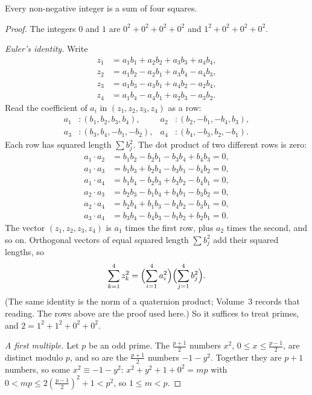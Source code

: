 \begin{theorem}[Lagrange, 1770]\label{thm:foursq}
Every non-negative integer is a sum of four squares.
\end{theorem}
\begin{proof}
The integers $0$ and $1$ are $0^2+0^2+0^2+0^2$ and $1^2+0^2+0^2+0^2$.

\emph{Euler's identity.} Write
\begin{align*}
z_1&=a_1b_1+a_2b_2+a_3b_3+a_4b_4,\\
z_2&=a_1b_2-a_2b_1+a_3b_4-a_4b_3,\\
z_3&=a_1b_3-a_3b_1+a_4b_2-a_2b_4,\\
z_4&=a_1b_4-a_4b_1+a_2b_3-a_3b_2.
\end{align*}
Read the coefficient of $a_i$ in $(z_1,z_2,z_3,z_4)$ as a row:
\[
\begin{aligned}
a_1&\colon (b_1,b_2,b_3,b_4),&
a_2&\colon (b_2,-b_1,-b_4,b_3),\\
a_3&\colon (b_3,b_4,-b_1,-b_2),&
a_4&\colon (b_4,-b_3,b_2,-b_1).
\end{aligned}
\]
Each row has squared length $\sum b_j^2$. The dot product of two different rows is zero:
\begin{align*}
a_1\cdot a_2&=b_1b_2-b_2b_1-b_3b_4+b_4b_3=0,\\
a_1\cdot a_3&=b_1b_3+b_2b_4-b_3b_1-b_4b_2=0,\\
a_1\cdot a_4&=b_1b_4-b_2b_3+b_3b_2-b_4b_1=0,\\
a_2\cdot a_3&=b_2b_3-b_1b_4+b_4b_1-b_3b_2=0,\\
a_2\cdot a_4&=b_2b_4+b_1b_3-b_4b_2-b_3b_1=0,\\
a_3\cdot a_4&=b_3b_4-b_4b_3-b_1b_2+b_2b_1=0.
\end{align*}
The vector $(z_1,z_2,z_3,z_4)$ is $a_1$ times the first row, plus $a_2$ times the second, and so on. Orthogonal vectors of equal squared length $\sum b_j^2$ add their squared lengths, so
\[
\sum_{k=1}^4 z_k^2
=\Bigl(\sum_{i=1}^4 a_i^2\Bigr)\Bigl(\sum_{j=1}^4 b_j^2\Bigr).
\]
(The same identity is the norm of a quaternion product; Volume~3 records that reading. The rows above are the proof used here.) So it suffices to treat primes, and $2=1^2+1^2+0^2+0^2$.

\emph{A first multiple.} Let $p$ be an odd prime. The $\frac{p+1}2$ numbers $x^2$, $0\le x\le\frac{p-1}2$, are distinct modulo $p$, and so are the $\frac{p+1}2$ numbers $-1-y^2$. Together they are $p+1$ numbers, so some $x^2\equiv-1-y^2$: $x^2+y^2+1+0^2=mp$ with $0<mp\le2\left(\frac{p-1}2\right)^2+1<p^2$, so $1\le m<p$.


\end{proof}
